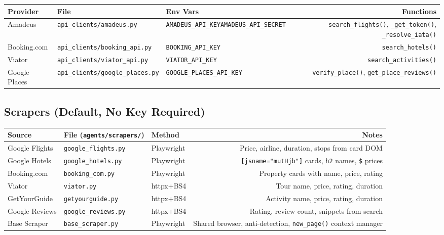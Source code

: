 \documentclass[11pt,a4paper]{article}
\begin{document}
{\small
\begin{tabularx}{\textwidth}{@{}L{2.4cm}L{2.6cm}L{3.4cm}R@{}}
\toprule
\textbf{Provider} & \textbf{File} & \textbf{Env Vars} & \textbf{Functions} \\
\midrule
Amadeus       & \texttt{api\_clients/\allowbreak amadeus.py}       & \texttt{AMADEUS\_API\_KEY}\newline\texttt{AMADEUS\_API\_SECRET} & \texttt{search\_flights()}, \texttt{\_get\_token()}, \texttt{\_resolve\_iata()} \\[4pt]
Booking.com   & \texttt{api\_clients/\allowbreak booking\_api.py}  & \texttt{BOOKING\_API\_KEY}           & \texttt{search\_hotels()} \\[4pt]
Viator        & \texttt{api\_clients/\allowbreak viator\_api.py}   & \texttt{VIATOR\_API\_KEY}            & \texttt{search\_activities()} \\[4pt]
Google Places & \texttt{api\_clients/\allowbreak google\_places.py}& \texttt{GOOGLE\_PLACES\_API\_KEY}    & \texttt{verify\_place()}, \texttt{get\_place\_reviews()} \\
\bottomrule
\end{tabularx}}

\subsection{Scrapers (Default, No Key Required)}

{\small
\begin{tabularx}{\textwidth}{@{}L{2.4cm}L{3.0cm}L{1.8cm}R@{}}
\toprule
\textbf{Source} & \textbf{File} (\texttt{agents/scrapers/}) & \textbf{Method} & \textbf{Notes} \\
\midrule
Google Flights & \texttt{google\_flights.py}  & Playwright & Price, airline, duration, stops from card DOM \\[4pt]
Google Hotels  & \texttt{google\_hotels.py}   & Playwright & \texttt{[jsname="mutHjb"]} cards, \texttt{h2} names, \texttt{\$} prices \\[4pt]
Booking.com    & \texttt{booking\_com.py}     & Playwright & Property cards with name, price, rating \\[4pt]
Viator         & \texttt{viator.py}           & httpx+BS4  & Tour name, price, rating, duration \\[4pt]
GetYourGuide   & \texttt{getyourguide.py}     & httpx+BS4  & Activity name, price, rating, duration \\[4pt]
Google Reviews & \texttt{google\_reviews.py}  & httpx+BS4  & Rating, review count, snippets from search \\[4pt]
Base Scraper   & \texttt{base\_scraper.py}    & Playwright & Shared browser, anti-detection, \texttt{new\_page()} context manager \\
\bottomrule
\end{tabularx}}
\end{document}
